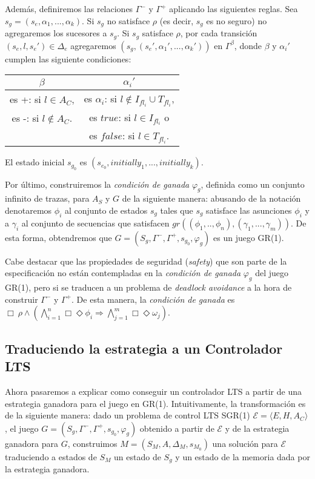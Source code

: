 Además, definiremos las relaciones $\Gamma^-$ y $\Gamma^+$ aplicando las siguientes reglas. Sea $s_g =
(s_e,\alpha_1,...,\alpha_k)$. Si $s_g$ no satisface $\rho$ (es decir, $s_g$ es no seguro) no agregaremos los sucesores a
$s_g$. Si $s_g$ satisface $\rho$, por cada transición $(s_e,l,s_e') \in \Delta_e$ agregaremos
$(s_g,(s_e',\alpha_1',...,\alpha_k'))$ en $\Gamma^{\beta}$, donde $\beta$ y $\alpha_i'$ cumplen las siguiente
condiciones:

\begin{center}
\begin{tabular}{ c | c}
$\beta$ & $\alpha_i'$ \\
\hline
es +: si $l \in A_C$, & es $\alpha_i$: si $l \notin I_{fl_i} \cup T_{fl_i}$, \\
es -: si $l \notin A_C$. & es $true$: si $l \in I_{fl_i}$ o \\
& es $false$: si $l \in T_{fl_i}$. \\
\end{tabular}
\end{center}

El estado inicial $s_{g_0}$ es $(s_{e_0},initially_1,...,initially_k)$.

Por último, construiremos la \emph{condición de ganada} $\varphi_g$, definida como un conjunto infinito de trazas, para
$A_S$ y $G$ de la siguiente manera: abusando de la notación denotaremos $\phi_i$ al conjunto de estados $s_g$ tales que
$s_g$ satisface las asunciones $\phi_i$ y a $\gamma_i$ al conjunto de secuencias que satisfacen
$gr((\phi_1,..,\phi_n),(\gamma_1,...,\gamma_m))$. De esta forma, obtendremos que $G = (S_g,\Gamma^-,\Gamma^+,s_{g_0},\varphi_g)$ es un
juego GR(1).

Cabe destacar que las propiedades de seguridad (\emph{safety}) que son parte de la especificación no están contempladas en la
\emph{condición de ganada} $\varphi_g$ del juego GR(1), pero si se traducen a un problema de \emph{deadlock avoidance} a
la hora de construir $\Gamma^-$ y $\Gamma^+$. De esta manera, la \emph{condición de ganada} es  $\Box\ \rho
\wedge(\bigwedge_{i=1}^n\Box\Diamond\phi_i \Rightarrow \bigwedge_{j=1}^m \Box\Diamond\omega_j)$.

\subsection{Traduciendo la estrategia a un Controlador LTS}

Ahora pasaremos a explicar como conseguir un controlador LTS a partir de una estrategia ganadora para el juego en GR(1).
Intuitivamente, la transformación es de la siguiente manera: dado un problema de control LTS SGR(1) $\mathcal{E} =
\langle E,H,A_C\rangle$, el juego $G = (S_g, \Gamma^-, \Gamma^+, s_{g_0},\varphi_g)$ obtenido a partir de $\mathcal{E}$ y de la
estrategia ganadora para $G$, construimos $M = (S_M,A,\Delta_M,s_{M_0})$ una solución para $\mathcal{E}$ traduciendo
a estados de $S_M$ un estado de $S_g$ y un estado de la memoria dada por la estrategia ganadora.

